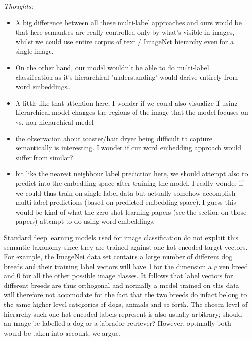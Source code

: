 \documentclass[12pt]{report}
\begin{document}
\textit{Thoughts:}
\begin{itemize}
    \item A big difference between all these multi-label approaches and ours would be that here semantics are really controlled only by what's visible in images, whilst we could use entire corpus of text / ImageNet hierarchy even for a single image.
    \item On the other hand, our model wouldn't be able to do multi-label classification as it's hierarchical 'understanding' would derive entirely from word embeddings..
    \item A little like that attention here, I wonder if we could also visualize if using hierarchical model changes the regions of the image that the model focuses on vs. non-hierarchical model
    \item the observation about toaster/hair dryer being difficult to capture semantically is interesting. I wonder if our word embedding approach would suffer from similar? 
    \item bit like the nearest neighbour label prediction here, we should attempt also to predict into the embedding space after training the model. I really wonder if we could thus train on single label data but actually somehow accomplish multi-label predictions (based on predicted embedding space). I guess this would be kind of what the zero-shot learning papers (see the section on those papers) attempt to do using word embeddings. 
  \end{itemize}










Standard deep learning models used for image classification do not exploit this semantic taxonomy since they are trained against one-hot encoded target vectors. For example, the ImageNet data set \cite{JiaDeng2009} contains a large number of different dog breeds and their training label vectors will have 1 for the dimension a given breed and 0 for all the other possible image classes. It follows that label vectors for different breeds are thus orthogonal and normally a model trained on this data will therefore not accomodate for the fact that the two breeds do infact belong to the same higher level categories of dogs, animals and so forth. The chosen level of hierarchy such one-hot encoded labels represent is also usually arbitrary; should an image be labelled a dog or a labrador retriever? However, optimally both would be taken into account, we argue. 
\end{document}
